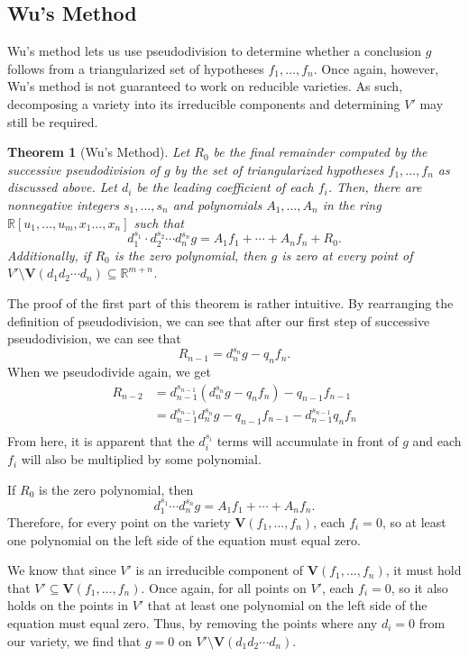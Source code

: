 \documentclass[12pt]{article}
\theoremstyle{plain}
\newtheorem{Theorem}{Theorem}
\theoremstyle{definition}
\theoremstyle{remark}
\begin{document}
\subsection{Wu's Method}
Wu's method lets us use pseudodivision to determine whether a conclusion $g$ follows from a triangularized set of hypotheses $f_1,\dots,f_n$.
Once again, however, Wu's method is not guaranteed to work on reducible varieties. As such, decomposing a variety into its irreducible components and determining $V'$ may still be required.
\begin{Theorem}[Wu's Method]
    Let $R_0$ be the final remainder computed by the successive pseudodivision of $g$ by the set of triangularized hypotheses $f_1,\dots,f_n$ as discussed above.
    Let $d_i$ be the leading coefficient of each $f_i$. 
    Then, there are nonnegative integers $s_1,\dots,s_n$ and polynomials $A_1,\dots,A_n$ in the ring $\mathbb{R}[u_1,\dots,u_m,x_1\dots,x_n]$ such that
    $$d_{1}^{s_1}\cdot d_2^{s_2} \cdots d_n^{s_n} g = A_1 f_1 + \cdots + A_n f_n + R_0.$$
    Additionally, if $R_0$ is the zero polynomial, then $g$ is zero at every point of $V' \setminus \textbf{V}(d_1d_2\cdots d_n) \subseteq \mathbb{R}^{m+n}$.
\end{Theorem}
The proof of the first part of this theorem is rather intuitive. 
By rearranging the definition of pseudodivision, we can see that after our first step of successive pseudodivision, we can see that $$R_{n-1} = d_n^{s_n} g - q_nf_n.$$
When we pseudodivide again, we get
\begin{align*}
    R_{n-2} & = d_{n-1}^{s_{n-1}}(d_n^{s_n} g - q_nf_n) - q_{n-1}f_{n-1}\\
            & = d_{n-1}^{s_{n-1}}d_n^{s_n} g - q_{n-1}f_{n-1} - d_{n-1}^{s_{n-1}}q_nf_n \\
\end{align*}
From here, it is apparent that the $d_i^{s_i}$ terms will accumulate in front of $g$ and each $f_i$ will also be multiplied by some polynomial.

If $R_0$ is the zero polynomial, then $$d_{1}^{s_1} \cdots d_n^{s_n} g = A_1 f_1 + \cdots + A_n f_n.$$
Therefore, for every point on the variety $\textbf{V}(f_1,\dots,f_n)$, each $f_i = 0$, so at least one polynomial on the left side of the equation must equal zero. 

We know that since $V'$ is an irreducible component of $\textbf{V}(f_1,\dots,f_n)$, it must hold that $V' \subseteq \textbf{V}(f_1,\dots,f_n)$.
Once again, for all points on $V'$, each $f_i = 0$, so it also holds on the points in $V'$ that at least one polynomial on the left side of the equation must equal zero.  
Thus, by removing the points where any $d_i = 0$ from our variety, we find that $g = 0$ on $V' \setminus \textbf{V}(d_1d_2\cdots d_n)$. 
\end{document}
